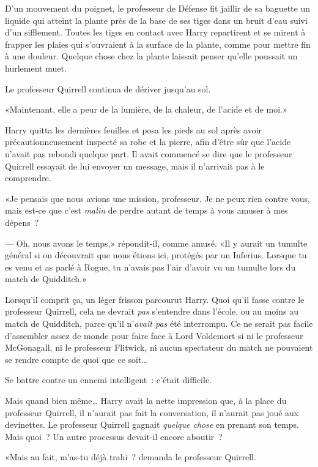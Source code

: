 D'un mouvement du poignet, le professeur de Défense fit jaillir de sa baguette un liquide qui atteint la plante près de la base de ses tiges dans un bruit d'eau suivi d'un sifflement. Toutes les tiges en contact avec Harry repartirent et se mirent à frapper les plaies qui s'ouvraient à la surface de la plante, comme pour mettre fin à une douleur. Quelque chose chez la plante laissait penser qu'elle poussait un hurlement muet.

Le professeur Quirrell continua de dériver jusqu'au sol.

«Maintenant, elle a peur de la lumière, de la chaleur, de l'acide et de moi.»

Harry quitta les dernières feuilles et posa les pieds au sol après avoir précautionneusement inspecté sa robe et la pierre, afin d'être sûr que l'acide n'avait pas rebondi quelque part. Il avait commencé se dire que le professeur Quirrell essayait de lui envoyer un message, mais il n'arrivait pas à le comprendre.

«Je pensais que nous avions une mission, professeur. Je ne peux rien contre vous, mais est-ce que c'est \emph{malin} de perdre autant de temps à vous amuser à mes dépens~?

--- Oh, nous avons le temps,» répondit-il, comme amusé. «Il y aurait un tumulte général si on découvrait que nous étions ici, protégés par un Inferius. Lorsque tu es venu et as parlé à Rogue, tu n'avais pas l'air d'avoir vu un tumulte lors du match de Quidditch.»

Lorsqu'il comprit ça, un léger frisson parcourut Harry. Quoi qu'il fasse contre le professeur Quirrell, cela ne devrait \emph{pas} s'entendre dans l'école, ou au moins au match de Quidditch, parce qu'il n'\emph{avait pas} été interrompu. Ce ne serait pas facile d'assembler assez de monde pour faire face à Lord Voldemort si ni le professeur McGonagall, ni le professeur Flitwick, ni aucun spectateur du match ne pouvaient se rendre compte de quoi que ce soit…

Se battre contre un ennemi intelligent~: c'était difficile.

Mais quand bien même… Harry avait la nette impression que, à la place du professeur Quirrell, il n'aurait pas fait la conversation, il n'aurait pas joué aux devinettes. Le professeur Quirrell gagnait \emph{quelque chose} en prenant son temps. Mais quoi~? Un autre processus devait-il encore aboutir~?

«Mais au fait, m'as-tu déjà trahi~? demanda le professeur Quirrell.

